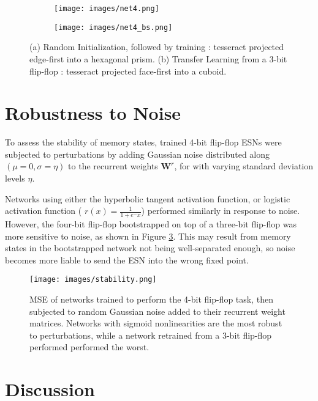 \documentclass{article} %
\newcommand{\bf}[1]{\mathbf{#1}}
\begin{document}
\begin{figure}
\centering
\begin{subfigure}{.5\textwidth}
  \centering
  \texttt{[image: images/net4.png]}
  \caption{}
  \label{fig:net4hex}
\end{subfigure}%
\begin{subfigure}{.5\textwidth}
  \centering
  \texttt{[image: images/net4\_bs.png]}
  \caption{}
\end{subfigure}
\caption{(a) Random Initialization, followed by training : tesseract projected edge-first into a hexagonal prism. (b) Transfer Learning from a 3-bit flip-flop : tesseract projected face-first into a cuboid.}
\label{fig:net4bs}
\end{figure}

\section{Robustness to Noise}

To assess the stability of memory states, trained 4-bit flip-flop ESNs were subjected to perturbations by adding Gaussian noise distributed along $(\mu=0,\sigma=\eta)$ to the recurrent weights $\bf{W}^r$, for with varying standard deviation levels $\eta$.

Networks using either the hyperbolic tangent activation function, or logistic activation function ( $r(x) = \frac{1}{1+e^-x}$) performed similarly in response to noise. However, the four-bit flip-flop bootstrapped on top of a three-bit flip-flop was more sensitive to noise, as shown in Figure \ref{fig:stabilty}. This may result from memory states in the bootstrapped network not being well-separated enough, so noise becomes more liable to send the ESN into the wrong fixed point.

\begin{figure}
\centering
\texttt{[image: images/stability.png]}
\caption{MSE of networks trained to perform the 4-bit flip-flop task, then subjected to random Gaussian noise added to their recurrent weight matrices. Networks with sigmoid nonlinearities are the most robust to perturbations, while a network retrained from a 3-bit flip-flop performed performed the worst.}
\label{fig:stabilty}
\end{figure}

\section{Discussion}
\end{document}
